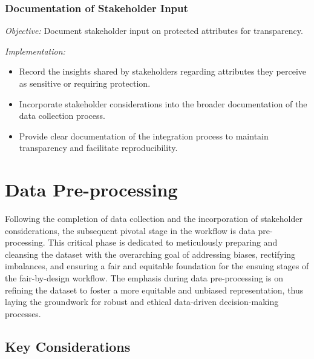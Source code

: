 \subsubsection{Documentation of Stakeholder Input}

\emph{Objective:} Document stakeholder input on protected attributes for transparency.

\emph{Implementation:}

\begin{itemize}

    \item Record the insights shared by stakeholders regarding attributes they perceive as sensitive or requiring protection.

    \item Incorporate stakeholder considerations into the broader documentation of the data collection process.

    \item Provide clear documentation of the integration process to maintain transparency and facilitate reproducibility.

\end{itemize}

\section{Data Pre-processing}
\label{section:pre-proc}

Following the completion of data collection and the incorporation of stakeholder considerations, the subsequent pivotal stage in the workflow is data pre-processing. This critical phase is dedicated to meticulously preparing and cleansing the dataset with the overarching goal of addressing biases, rectifying imbalances, and ensuring a fair and equitable foundation for the ensuing stages of the fair-by-design workflow. The emphasis during data pre-processing is on refining the dataset to foster a more equitable and unbiased representation, thus laying the groundwork for robust and ethical data-driven decision-making processes.

\subsection{Key Considerations}

